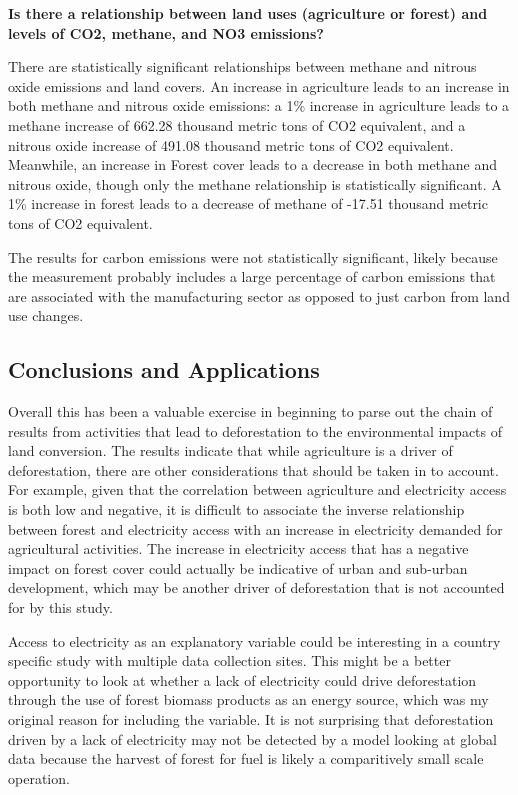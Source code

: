 \documentclass[12pt,]{article}
\begin{document}
\textbf{Is there a relationship between land uses (agriculture or
forest) and levels of CO2, methane, and NO3 emissions?}

There are statistically significant relationships between methane and
nitrous oxide emissions and land covers. An increase in agriculture
leads to an increase in both methane and nitrous oxide emissions: a 1\%
increase in agriculture leads to a methane increase of 662.28 thousand
metric tons of CO2 equivalent, and a nitrous oxide increase of 491.08
thousand metric tons of CO2 equivalent. Meanwhile, an increase in Forest
cover leads to a decrease in both methane and nitrous oxide, though only
the methane relationship is statistically significant. A 1\% increase in
forest leads to a decrease of methane of -17.51 thousand metric tons of
CO2 equivalent.

The results for carbon emissions were not statistically significant,
likely because the measurement probably includes a large percentage of
carbon emissions that are associated with the manufacturing sector as
opposed to just carbon from land use changes.

\subsection{Conclusions and
Applications}\label{conclusions-and-applications}

Overall this has been a valuable exercise in beginning to parse out the
chain of results from activities that lead to deforestation to the
environmental impacts of land conversion. The results indicate that
while agriculture is a driver of deforestation, there are other
considerations that should be taken in to account. For example, given
that the correlation between agriculture and electricity access is both
low and negative, it is difficult to associate the inverse relationship
between forest and electricity access with an increase in electricity
demanded for agricultural activities. The increase in electricity access
that has a negative impact on forest cover could actually be indicative
of urban and sub-urban development, which may be another driver of
deforestation that is not accounted for by this study.

Access to electricity as an explanatory variable could be interesting in
a country specific study with multiple data collection sites. This might
be a better opportunity to look at whether a lack of electricity could
drive deforestation through the use of forest biomass products as an
energy source, which was my original reason for including the variable.
It is not surprising that deforestation driven by a lack of electricity
may not be detected by a model looking at global data because the
harvest of forest for fuel is likely a comparitively small scale
operation.
\end{document}

